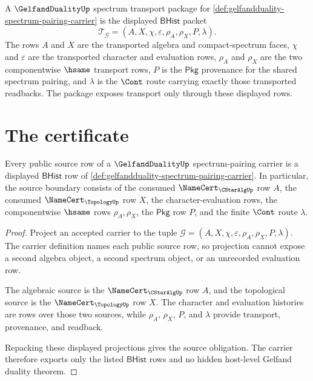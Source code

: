 \begin{definition}
\label{def:gelfandduality-spectrum-transport-package}
A $\GelfandDualityUp$ spectrum transport package for
\autoref{def:gelfandduality-spectrum-pairing-carrier} is the displayed
$\mathsf{BHist}$ packet
$$
\mathcal{T}_{\mathcal{G}}=(A,X,\chi,\varepsilon,\rho_{A},\rho_{X},P,\lambda).
$$
The rows $A$ and $X$ are the transported algebra and compact-spectrum faces,
$\chi$ and $\varepsilon$ are the transported character and evaluation rows,
$\rho_{A}$ and $\rho_{X}$ are the two componentwise $\hsame$ transport rows,
$P$ is the $\mathsf{Pkg}$ provenance for the shared spectrum pairing, and
$\lambda$ is the $\Cont$ route carrying exactly those transported readbacks.
The package exposes transport only through these displayed rows.
\end{definition}

\section{The certificate}
\label{sec:gelfandduality-certificate}

\begin{theorem}
\label{thm:gelfandduality-spectrum-source-obligation}
Every public source row of a $\GelfandDualityUp$ spectrum-pairing carrier is
a displayed $\mathsf{BHist}$ row of
\autoref{def:gelfandduality-spectrum-pairing-carrier}. In particular, the
source boundary consists of the consumed $\NameCert_{\CStarAlgUp}$ row $A$,
the consumed $\NameCert_{\TopologyUp}$ row $X$, the character-evaluation
rows, the componentwise $\hsame$ rows $\rho_{A},\rho_{X}$, the $\mathsf{Pkg}$
row $P$, and the finite $\Cont$ route $\lambda$.
\end{theorem}
\begin{proof}
Project an accepted carrier to the tuple
$\mathcal{G}=(A,X,\chi,\varepsilon,\rho_{A},\rho_{X},P,\lambda)$. The carrier
definition names each public source row, so projection cannot expose a second
algebra object, a second spectrum object, or an unrecorded evaluation row.

The algebraic source is the $\NameCert_{\CStarAlgUp}$ row $A$, and the
topological source is the $\NameCert_{\TopologyUp}$ row $X$. The character
and evaluation histories are rows over those two sources, while $\rho_{A}$,
$\rho_{X}$, $P$, and $\lambda$ provide transport, provenance, and readback.

Repacking these displayed projections gives the source obligation. The
carrier therefore exports only the listed $\mathsf{BHist}$ rows and no hidden
host-level Gelfand duality theorem.
\end{proof}

